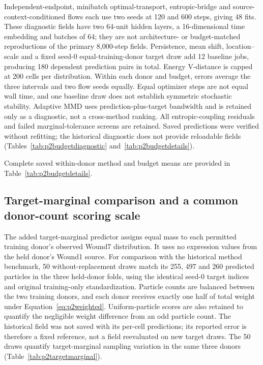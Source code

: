 \documentclass[10pt,a4paper]{article}
\begin{document}
Independent-endpoint, minibatch optimal-transport, entropic-bridge and source-context-conditioned flows each use two seeds at 120 and 600 steps, giving 48 fits. These diagnostic fields have two 64-unit hidden layers, a 16-dimensional time embedding and batches of 64; they are not architecture- or budget-matched reproductions of the primary 8,000-step fields. Persistence, mean shift, location--scale and a fixed seed-0 equal-training-donor target draw add 12 baseline jobs, producing 180 dependent prediction pairs in total. Energy V-distance is capped at 200 cells per distribution. Within each donor and budget, errors average the three intervals and two flow seeds equally. Equal optimizer steps are not equal wall time, and one baseline draw does not establish symmetric stochastic stability. Adaptive MMD uses prediction-plus-target bandwidth and is retained only as a diagnostic, not a cross-method ranking. All entropic-coupling residuals and failed marginal-tolerance screens are retained. Saved predictions were verified without refitting; the historical diagnostic does not provide reloadable fields (Tables~\ref{tab:p2budgetdiagnostic} and~\ref{tab:p2budgetdetails}).

Complete saved within-donor method and budget means are provided in Table~\ref{tab:p2budgetdetails}.

\subsection{Target-marginal comparison and a common donor-count scoring scale}
The added target-marginal predictor assigns equal mass to each permitted training donor's observed Wound7 distribution. It uses no expression values from the held donor's Wound1 source. For comparison with the historical method benchmark, 50 without-replacement draws match its 255, 497 and 260 predicted particles in the three held-donor folds, using the identical seed-0 target indices and original training-only standardization. Particle counts are balanced between the two training donors, and each donor receives exactly one half of total weight under Equation~\eqref{eq:p2weighted}. Uniform-particle scores are also retained to quantify the negligible weight difference from an odd particle count. The historical field was not saved with its per-cell predictions; its reported error is therefore a fixed reference, not a field reevaluated on new target draws. The 50 draws quantify target-marginal sampling variation in the same three donors (Table~\ref{tab:p2targetmarginal}).
\end{document}

